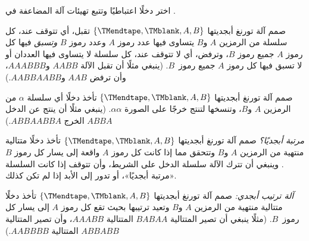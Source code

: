\documentclass[../../../include/open-logic-section]{subfiles}
\begin{document}
\begin{prob}
اختر دخلًا اعتباطيًا وتتبع تهيئات آلة المضاعفة في
.
\end{prob}

\begin{prob}
صمم آلة تورنغ أبجديتها $\{\TMendtape,\TMblank,A,B\}$ تقبل، أي تتوقف
عند، كل سلسلة من الرمزين $A$ و$B$ يتساوى فيها عدد رموز $A$ وعدد رموز
$B$ \emph{وتسبق} فيها كل رموز $A$ جميع رموز $B$، وترفض، أي لا تتوقف
عند، كل سلسلة لا يتساوى فيها العددان أو لا تسبق فيها كل رموز $A$
جميع رموز~$B$. (ينبغي مثلًا أن تقبل الآلة $AABB$ و$AAABBB$، وأن ترفض
$AAB$ و$AABBAABB$.)
\end{prob}

\begin{prob}
صمم آلة تورنغ أبجديتها $\{\TMendtape,\TMblank,A,B\}$ تأخذ دخلًا أي
سلسلة $\alpha$ من الرمزين $A$ و$B$، وتنسخها لتنتج خرجًا على الصورة
$\alpha\alpha$. (ينبغي مثلًا أن ينتج عن الدخل $ABBA$ الخرج
$ABBAABBA$.)
\end{prob}

\begin{prob}
\emph{مرتبة أبجديًا؟} صمم آلة تورنغ أبجديتها
$\{\TMendtape,\TMblank,A,B\}$ تأخذ دخلًا متتالية منتهية من الرمزين
$A$ و$B$ وتتحقق مما إذا كانت كل رموز $A$ واقعة إلى يسار كل رموز $B$.
وينبغي أن تترك الآلة سلسلة الدخل على الشريط، وأن تتوقف إذا كانت
السلسلة «مرتبة أبجديًا»، أو تدور إلى الأبد إذا لم تكن كذلك.
\end{prob}

\begin{prob}
\emph{آلة ترتيب أبجدي:} صمم آلة تورنغ أبجديتها
$\{\TMendtape,\TMblank,A,B\}$ تأخذ دخلًا متتالية منتهية من الرمزين
$A$ و$B$ وتعيد ترتيبها بحيث تقع كل رموز $A$ إلى يسار كل رموز~$B$.
(مثلًا ينبغي أن تصير المتتالية $BABAA$ المتتالية $AAABB$، وأن تصير
المتتالية $ABBABB$ المتتالية $AABBBB$.)
\end{prob}
\end{document}
